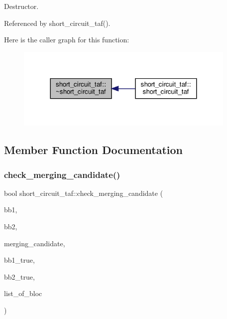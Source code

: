 Destructor. 



Referenced by short\+\_\+circuit\+\_\+taf().

Here is the caller graph for this function\+:
\nopagebreak
\begin{figure}[H]
\begin{center}
\leavevmode
\includegraphics[width=300pt]{dd/d1c/classshort__circuit__taf_a7c67b889806ffa462904b9bdfcebaba0_icgraph}
\end{center}
\end{figure}


\subsection{Member Function Documentation}
\mbox{\label{classshort__circuit__taf_a5d3b7d29cc59c1bd90bdb77872d90c77}} 
\subsubsection{\texorpdfstring{check\+\_\+merging\+\_\+candidate()}{check\_merging\_candidate()}}
{\footnotesize\ttfamily bool short\+\_\+circuit\+\_\+taf\+::check\+\_\+merging\+\_\+candidate (\begin{DoxyParamCaption}\item[{unsigned int \&}]{bb1,  }\item[{unsigned int \&}]{bb2,  }\item[{unsigned int}]{merging\+\_\+candidate,  }\item[{bool \&}]{bb1\+\_\+true,  }\item[{bool \&}]{bb2\+\_\+true,  }\item[{std\+::map$<$ unsigned int, bloc\+Ref $>$ \&}]{list\+\_\+of\+\_\+bloc }\end{DoxyParamCaption})\hspace{0.3cm}{\ttfamily [private]}}



